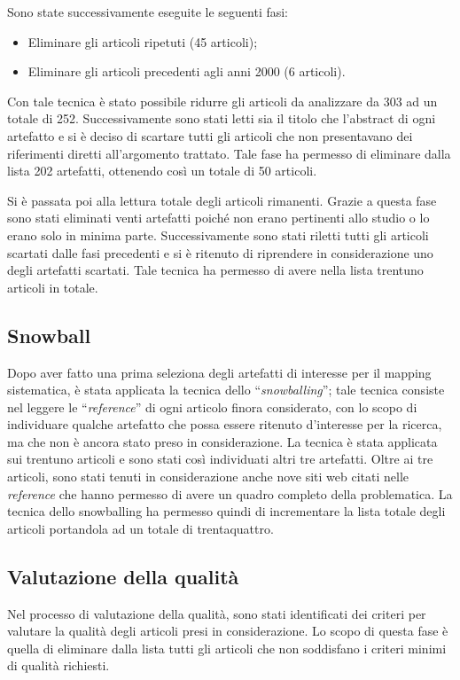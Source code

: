 Sono state successivamente eseguite le seguenti fasi:
\begin{itemize}
	\item Eliminare gli articoli ripetuti (45 articoli);
	\item Eliminare gli articoli precedenti agli anni 2000 (6 articoli).
\end{itemize}

Con tale tecnica è stato possibile ridurre gli articoli da analizzare da 303 ad un totale di 252. Successivamente sono stati letti sia il titolo che l’abstract di ogni artefatto e si è deciso di scartare tutti gli articoli che non presentavano dei riferimenti diretti all’argomento trattato. Tale fase ha permesso di eliminare dalla lista 202 artefatti, ottenendo così un totale di 50 articoli.

Si è passata poi alla lettura totale degli articoli rimanenti. Grazie a questa fase sono stati eliminati venti artefatti poiché non erano pertinenti allo studio o lo erano solo in minima parte. Successivamente sono stati riletti tutti gli articoli scartati dalle fasi precedenti e si è ritenuto di riprendere in considerazione uno degli artefatti scartati. Tale tecnica ha permesso di avere nella lista trentuno articoli in totale.
\subsection{Snowball}
Dopo aver fatto una prima seleziona degli artefatti di interesse per il mapping sistematica, è stata applicata la tecnica dello “\emph{snowballing}”; tale tecnica consiste nel leggere le “\emph{reference}” di ogni articolo finora considerato, con lo scopo di individuare qualche artefatto che possa essere ritenuto d’interesse per la ricerca, ma che non è ancora stato preso in considerazione. La tecnica è stata applicata sui trentuno articoli e sono stati così individuati altri tre artefatti. Oltre ai tre articoli, sono stati tenuti in considerazione anche nove siti web citati nelle \emph{reference} che hanno permesso di avere un quadro completo della problematica. La tecnica dello snowballing ha permesso quindi di incrementare la lista totale degli articoli portandola ad un totale di trentaquattro.
\subsection{Valutazione della qualità}
Nel processo di valutazione della qualità, sono stati identificati dei criteri per valutare la qualità degli articoli presi in considerazione. Lo scopo di questa fase è quella di eliminare dalla lista tutti gli articoli che non soddisfano i criteri minimi di qualità richiesti.

